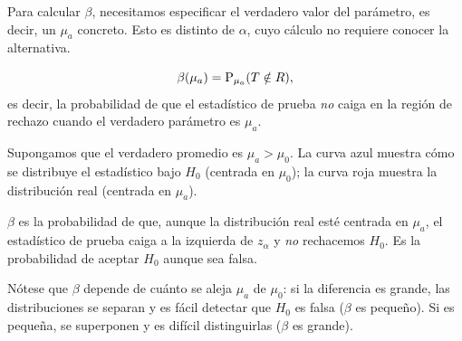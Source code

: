 Para calcular \(\beta\), necesitamos especificar el verdadero valor del parámetro, es decir, un \(\mu_a\) concreto. Esto es distinto de \(\alpha\), cuyo cálculo no requiere conocer la alternativa.

\formal
\[\beta(\mu_a) = \operatorname{P}_{\mu_a}(T \notin R),\]
es decir, la probabilidad de que el estadístico de prueba \emph{no} caiga en la región de rechazo cuando el verdadero parámetro es \(\mu_a\).
\informal

Supongamos que el verdadero promedio es \(\mu_a > \mu_0\). La curva azul muestra cómo se distribuye el estadístico bajo \(H_0\) (centrada en \(\mu_0\)); la curva roja muestra la distribución real (centrada en \(\mu_a\)).


\(\beta\) es la probabilidad de que, aunque la distribución real esté centrada en \(\mu_a\), el estadístico de prueba caiga a la izquierda de \(z_\alpha\) y \emph{no} rechacemos \(H_0\). Es la probabilidad de aceptar \(H_0\) aunque sea falsa.

Nótese que \(\beta\) depende de cuánto se aleja \(\mu_a\) de \(\mu_0\): si la diferencia es grande, las distribuciones se separan y es fácil detectar que \(H_0\) es falsa (\(\beta\) es pequeño). Si es pequeña, se superponen y es difícil distinguirlas (\(\beta\) es grande).


